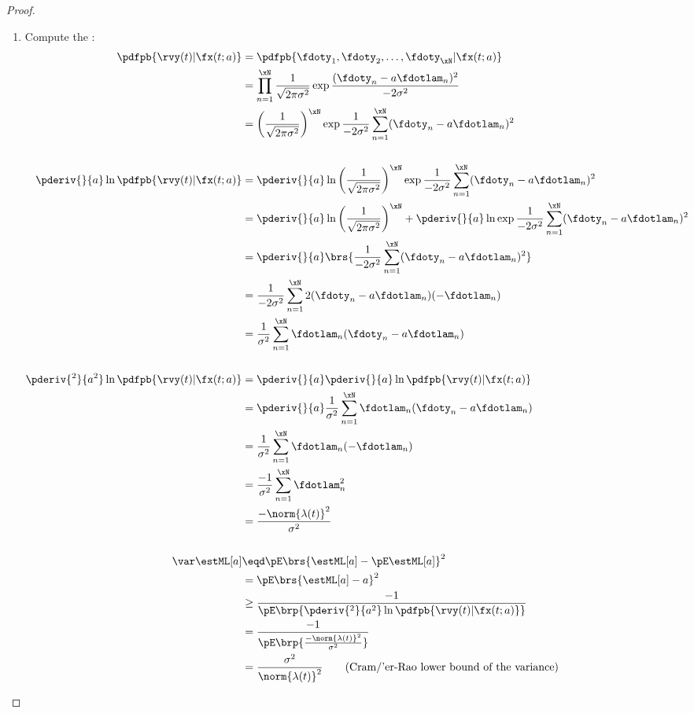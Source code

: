 \begin{proposition}
\begin{proof}
\begin{enumerate}
\item Compute the :
\begin{align*}
   \pdfpb{\rvy(t)|\fx(t; a)}
     &=  \pdfpb{\fdoty_1, \fdoty_2,\ldots,\fdoty_{\xN}|\fx(t; a)}
   \\&=  \prod_{n=1}^\xN \frac{1}{\sqrt{2\pi\sigma^2}}
          \exp{\frac{(\fdoty_n- a\fdotlam_n)^2}{-2\sigma^2}}
   \\&=  \left(\frac{1}{\sqrt{2\pi\sigma^2}}\right)^\xN
          \exp{\frac{1}{-2\sigma^2} \sum_{n=1}^\xN (\fdoty_n- a\fdotlam_n)^2}
\\
\\
   \pderiv{}{a}\ln\pdfpb{\rvy(t)|\fx(t; a)}
     &=  \pderiv{}{a}\ln
          \left(\frac{1}{\sqrt{2\pi\sigma^2}}\right)^\xN
          \exp{\frac{1}{-2\sigma^2} \sum_{n=1}^\xN (\fdoty_n- a\fdotlam_n)^2}
   \\&=  \pderiv{}{a}\ln
          \left(\frac{1}{\sqrt{2\pi\sigma^2}}\right)^\xN
       +  \pderiv{}{a}\ln
          \exp{\frac{1}{-2\sigma^2} \sum_{n=1}^\xN (\fdoty_n- a\fdotlam_n)^2}
   \\&=  \pderiv{}{a}
          \brs{\frac{1}{-2\sigma^2} \sum_{n=1}^\xN (\fdoty_n- a\fdotlam_n)^2}
   \\&=  \frac{1}{-2\sigma^2} \sum_{n=1}^\xN 2(\fdoty_n- a\fdotlam_n)(- \fdotlam_n)
   \\&=  \frac{1}{\sigma^2} \sum_{n=1}^\xN \fdotlam_n(\fdoty_n- a\fdotlam_n)
\\
\\
   \pderiv{^2}{a^2}\ln\pdfpb{\rvy(t)|\fx(t; a)}
     &=  \pderiv{}{a}\pderiv{}{a}\ln\pdfpb{\rvy(t)|\fx(t; a)}
   \\&=  \pderiv{}{a}
          \frac{1}{\sigma^2} \sum_{n=1}^\xN \fdotlam_n(\fdoty_n- a\fdotlam_n)
   \\&=  \frac{1}{\sigma^2} \sum_{n=1}^\xN \fdotlam_n(-\fdotlam_n)
   \\&=  \frac{-1}{\sigma^2} \sum_{n=1}^\xN \fdotlam_n^2
   \\&=  \frac{-\norm{\lambda(t)}^2}{\sigma^2}
\\
\\
   \var\estML[a]
     &\eqd \pE\brs{\estML[a]-\pE\estML[a]}^2
   \\&=    \pE\brs{\estML[a]- a}^2
   \\&\ge  \frac{-1}{\pE\brp{\pderiv{^2}{ a^2} \ln \pdfpb{\rvy(t)|\fx(t; a)}}}
   \\&=    \frac{-1}{\pE\brp{\frac{-\norm{\lambda(t)}^2}{\sigma^2}}}
   \\&=    \frac{\sigma^2}{\norm{\lambda(t)}^2}
     \qquad\text{(Cram/'er-Rao lower bound of the variance)}
\end{align*}


\end{enumerate}
\end{proof}
\end{proposition}
